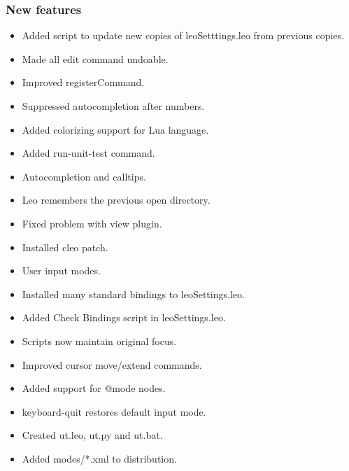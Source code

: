 \documentclass[a4paper,10pt,english]{sphinxmanual}
\begin{document}
\subsubsection{New features}
\label{what-is-new:id28}\begin{itemize}
\item {} 
Added script to update new copies of leoSetttings.leo from previous copies.

\item {} 
Made all edit command undoable.

\item {} 
Improved registerCommand.

\item {} 
Suppressed autocompletion after numbers.

\item {} 
Added colorizing support for Lua language.

\item {} 
Added run-unit-test command.

\item {} 
Autocompletion and calltips.

\item {} 
Leo remembers the previous open directory.

\item {} 
Fixed problem with view plugin.

\item {} 
Installed cleo patch.

\item {} 
User input modes.

\item {} 
Installed many standard bindings to leoSettings.leo.

\item {} 
Added Check Bindings script in leoSettings.leo.

\item {} 
Scripts now maintain original focus.

\item {} 
Improved cursor move/extend commands.

\item {} 
Added support for @mode nodes.

\item {} 
keyboard-quit restores default input mode.

\item {} 
Created ut.leo, ut.py and ut.bat.

\item {} 
Added modes/*.xml to distribution.


\end{itemize}
\end{document}
